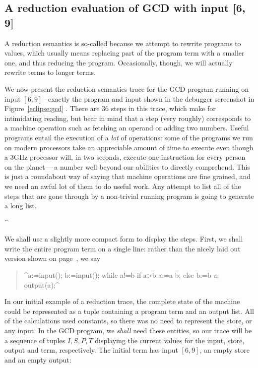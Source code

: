 \documentclass[11pt]{book}
\begin{document}
\subsection{A reduction evaluation of GCD with input [6, 9] }

A reduction semantics is so-called because we attempt to rewrite programs to values, which usually means replacing part of the program term with a smaller one, and thus reducing the program. Occasionally, though, we will actually rewrite terms to longer terms.

We now present the reduction semantics trace for the GCD program running on input $[6,9]$\,--\,exactly the program and input shown in the debugger screenshot in Figure~\ref{eclipse:gcd} . There are 36 steps in this trace, which make for intimidating reading, but bear in mind that a step (very roughly) corresponds to a machine operation such as fetching an operand or adding two numbers. Useful programs entail the execution of a {\em lot} of operations: some of the programs we run on modern processors take an appreciable amount of time to execute even though a 3GHz processor will, in two seconds, execute one instruction for every person on the planet\,---\,a number well beyond our abilities  to directly comprehend. This is just a roundabout way of saying that machine operations are fine grained, and we need an awful lot of them to do useful work. Any attempt to list all of the steps that are gone through by a non-trivial running program is going to generate a long list.

\lstMakeShortInline[language=Java,columns=fullflexible,basicstyle=\color{red}\sffamily]^

We shall use a slightly more compact form to display the steps. First, we shall write the entire program term on a single line: rather than the nicely laid out version shown on page~\pageref{GCDCava}, we say
\begin{quote}
\hspace*{-0.6cm}
^a:=input(); b:=input(); while a!=b if a>b a:=a-b; else b:=b-a; output(a);^
\end{quote}

In our initial example of a reduction trace, the complete state of the machine could be represented as a tuple containing a program term and an output list. All of the calculations used constants, so there was no need to represent the store, or any input. In the GCD program, we {\em shall} need these entities, so our trace will be a sequence of tuples $ I, S , P, T  $ displaying the current values for the input, store, output and term, respectively. The initial term has input $[6,9]$, an empty store and an empty output:
\end{document}
